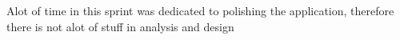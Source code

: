 Alot of time in this sprint was dedicated to polishing the application, therefore there is not alot of stuff in analysis and design




